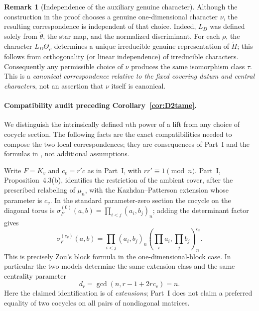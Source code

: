 \documentclass[11pt]{article}
\newcommand{\tH}{\widetilde H}
\theoremstyle{plain}
\theoremstyle{definition}
\newtheorem{remark}[theorem]{Remark}
\begin{document}
\begin{remark}[Independence of the auxiliary genuine character]
Although the construction in the proof chooses a genuine
one-dimensional character $\nu$, the resulting correspondence is
independent of that choice. Indeed, $L_D$ was defined solely from
$\widetilde\theta$, the star map, and the normalized discriminant.
For each $\rho$, the character $L_D\Theta_\rho$ determines a unique
irreducible genuine representation of $\tH$; this follows from
orthogonality (or linear independence) of irreducible characters.
Consequently any permissible choice of $\nu$ produces the same
isomorphism class $\tau$. This is a \emph{canonical correspondence
relative to the fixed covering datum and central characters}, not
an assertion that $\nu$ itself is canonical.
\end{remark}



\paragraph{Compatibility audit preceding Corollary~\ref{cor:D2tame}.}
We distinguish the intrinsically defined $n$th power of a lift from
any choice of cocycle section.  The following facts are the exact
compatibilities needed to compose the two local correspondences;
they are consequences of Part~I and the formulas in
\cite[\S\S2.2, 3.1]{Zou}, not additional assumptions.

Write $F=K_v$ and $c_v=r'c$ as in Part~I, with $rr'\equiv1\pmod n$.
Part~I, Proposition~4.3(b), identifies the restriction of the ambient
cover, after the prescribed relabeling of $\mu_n$, with the
Kazhdan--Patterson extension whose parameter is $c_v$.  In the
standard parameter-zero section the cocycle on the diagonal torus is
$\sigma_F^{(0)}(a,b)=\prod_{i<j}(a_i,b_j)_n$; adding the determinant
factor gives
\begin{equation}\label{eq:zou-cocycle-audit}
 \sigma_F^{(c_v)}(a,b)=
 \prod_{i<j}(a_i,b_j)_n
 \left(\prod_i a_i,\prod_j b_j\right)_n^{c_v}.
\end{equation}
This is precisely Zou's block formula \cite[(2.1)]{Zou} in the
one-dimensional-block case.  In particular the two models determine
the same extension class and the same centrality parameter
\[
 d_r=\gcd(n,r-1+2rc_v)=n.
\]
Here the claimed identification is of \emph{extensions}; Part~I does
not claim a preferred equality of two cocycles on all pairs of
nondiagonal matrices.
\end{document}
